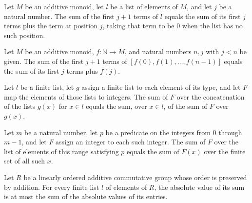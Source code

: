 \begin{theorem}
\label{List.sum_take_succ_getD}
\leanok
{}
Let $M$ be an additive monoid, let $l$ be a list of elements of $M$, and let $j$ be a
natural number. The sum of the first $j+1$ terms of $l$ equals the sum of its first $j$
terms plus the term at position $j$, taking that term to be $0$ when the list has no
such position.
\end{theorem}

\begin{theorem}
\label{List.sum_take_map_range_succ}
\leanok
{}
Let $M$ be an additive monoid, $f:\mathbb{N}\to M$, and natural numbers $n,j$ with
$j<n$ be given. The sum of the first $j+1$ terms of $[f(0),f(1),\ldots,f(n-1)]$ equals
the sum of its first $j$ terms plus $f(j)$.
\end{theorem}

\begin{theorem}
\label{List.sum_flatMap_map}
\leanok
{}
Let $l$ be a finite list, let $g$ assign a finite list to each element of its type, and
let $F$ map the elements of those lists to integers. The sum of $F$ over the
concatenation of the lists $g(x)$ for $x\in l$ equals the sum, over $x\in l$, of the sum
of $F$ over $g(x)$.
\end{theorem}

\begin{theorem}
\label{List.sum_filter_finRange}
\leanok
{}
Let $m$ be a natural number, let $p$ be a predicate on the integers from $0$ through
$m-1$, and let $F$ assign an integer to each such integer. The sum of $F$ over the list
of elements of this range satisfying $p$ equals the sum of $F(x)$ over the finite set of
all such $x$.
\end{theorem}

\begin{theorem}
\label{List.abs_sum_le_sum_abs}
\leanok
{}
Let $R$ be a linearly ordered additive commutative group whose order is preserved by
addition. For every finite list $l$ of elements of $R$, the absolute value of its sum is
at most the sum of the absolute values of its entries.
\end{theorem}


